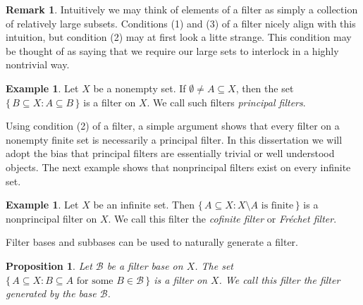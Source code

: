 \documentclass[12pt]{article}
\theoremstyle{plain}
\newtheorem{prop}[thm]{Proposition}
\theoremstyle{definition}
\newtheorem{rmk}[thm]{Remark}
\newtheorem{example}[thm]{Example}
\newcommand{\calB}{\mathcal{B}}
\begin{document}
\begin{rmk}
  Intuitively we may think of elements of a filter as simply a
  collection of relatively large subsets.
  Conditions (1) and (3) of a filter nicely align with this intuition,
  but condition (2) may at first look a litte strange.
  This condition may be thought of as saying that we require our large
  sets to interlock in a highly nontrivial way.%
\end{rmk}

\begin{example}
  Let $X$ be a nonempty set.
  If $\emptyset \ne A \subseteq X$, then the set $\{\, B \subseteq X :
  A \subseteq B \,\}$ is a filter on $X$.
  We call such filters \textsl{principal filters}.
\end{example}

Using condition (2) of a filter, a simple argument shows that every
filter on a nonempty finite set is necessarily a principal filter. 
In this dissertation we will adopt the bias that principal filters are
essentially trivial or well understood objects. 
The next example shows that nonprincipal filters exist on every
infinite set.

\begin{example}
  Let $X$ be an infinite set.
  Then $\{\, A \subseteq X : \mbox{$X \setminus A$ is finite} \,\}$ is
  a nonprincipal filter on $X$.
  We call this filter the \textsl{cofinite filter} or
  \textsl{Fr\'{e}chet filter}.
\end{example}

Filter bases and subbases can be used to naturally generate a filter.


\begin{prop}
  Let $\calB$ be a filter base on $X$.
  The set $\{\, A \subseteq X : \mbox{$B \subseteq A$ for some $B \in
    \calB$} \,\}$ is a filter on $X$.
  We call this filter the \textsl{filter generated by the base $\calB$}.
\end{prop}
\end{document}
